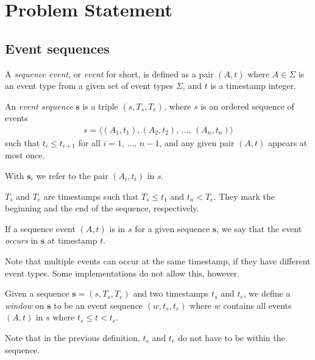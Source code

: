 \section{Problem Statement}

\subsection{Event sequences}

\begin{definition}
A \emph{sequence event}, or \emph{event} for short, is defined as a pair $ (A, t) $ where $ A \in \Sigma $ is an event type from a given set of event types $ \Sigma $, and $ t $ is a timestamp integer.
\end{definition}

\begin{definition}
An \emph{event sequence} $ \boldsymbol{s} $ is a triple $ (s, T_s, T_e) $, where $ s $ is an ordered sequence of events
\begin{align*}
s = \langle (A_1, t_1), (A_2, t_2), \, \ldots, \, (A_n, t_n) \rangle
\end{align*}
such that $ t_i \leq t_{i + 1} $ for all $ i = 1, \, \ldots, \, n - 1 $, and any given pair $ (A, t) $ appears at most once.

With $ \boldsymbol{s}_i $ we refer to the pair $ (A_i, t_i) $ in $ s $.

$ T_s $ and $ T_e $ are timestamps such that $ T_s \leq t_1 $ and $ t_n < T_e $. They mark the beginning and the end of the sequence, respectively.

If a sequence event $ (A, t) $ is in $ s $ for a given sequence $ \boldsymbol{s} $, we say that the event \emph{occurs} in $ \boldsymbol{s} $ at timestamp $ t $.
\end{definition}

Note that multiple events can occur at the same timestamp, if they have different event types. Some implementations do not allow this, however.

\begin{definition}
Given a sequence $ \boldsymbol{s} = (s, T_s, T_e) $ and two timestamps $ t_s $ and $ t_e $,
we define a \emph{window} on $ \boldsymbol{s} $ to be an event sequence $ (w, t_s, t_e) $ where $ w $ contains all events $ (A, t) $ in $ s $ where $ t_s \leq t < t_e $.
\end{definition}

Note that in the previous definition, $ t_s $ and $ t_e $ do not have to be within the sequence.

